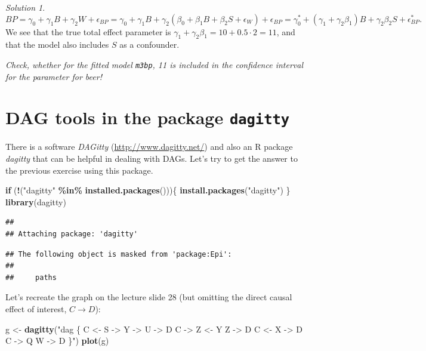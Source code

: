 \documentclass[
]{book}
\newenvironment{Shaded}{\begin{snugshade}}{\end{snugshade}}
\newcommand{\ControlFlowTok}[1]{\textcolor[rgb]{0.13,0.29,0.53}{\textbf{#1}}}
\newcommand{\FunctionTok}[1]{\textcolor[rgb]{0.13,0.29,0.53}{\textbf{#1}}}
\newcommand{\NormalTok}[1]{#1}
\newcommand{\OtherTok}[1]{\textcolor[rgb]{0.56,0.35,0.01}{#1}}
\newcommand{\SpecialCharTok}[1]{\textcolor[rgb]{0.81,0.36,0.00}{\textbf{#1}}}
\newcommand{\StringTok}[1]{\textcolor[rgb]{0.31,0.60,0.02}{#1}}
\theoremstyle{definition}
\theoremstyle{definition}
\theoremstyle{definition}
\theoremstyle{definition}
\theoremstyle{remark}
\newtheorem*{solution}{Solution}
\begin{document}
\begin{solution}
\[BP = \gamma_0 + \gamma_1 B + \gamma_2W + \epsilon_{BP} = 
\gamma_0 + \gamma_1 B + \gamma_2(\beta_0 + \beta_1 B + \beta_2S + \epsilon_W) + \epsilon_{BP} = \gamma_0^* + (\gamma_1 + \gamma_2\beta_1)B + \gamma_2\beta_2S + \epsilon_{BP}^*.\]
We see that the true total effect parameter is \(\gamma_1 + \gamma_2\beta_1 = 10 + 0.5\cdot 2 =11\), and that the model also includes \(S\) as a confounder.

\emph{Check, whether for the fitted model \texttt{m3bp}, 11 is included in the confidence interval for the parameter for beer!}

\end{solution}

\section{\texorpdfstring{DAG tools in the package \texttt{dagitty}}{DAG tools in the package dagitty}}\label{dag-tools-in-the-package-dagitty}

There is a software \emph{DAGitty} (\url{http://www.dagitty.net/}) and also an R package \emph{dagitty} that can be helpful in dealing with DAGs. Let's try to get the answer to the previous exercise using this package.

\begin{Shaded}
\begin{Highlighting}[]
\ControlFlowTok{if}\NormalTok{ (}\SpecialCharTok{!}\NormalTok{(}\StringTok{"dagitty"} \SpecialCharTok{\%in\%} \FunctionTok{installed.packages}\NormalTok{()))\{}
  \FunctionTok{install.packages}\NormalTok{(}\StringTok{"dagitty"}\NormalTok{)}
\NormalTok{\}}
\FunctionTok{library}\NormalTok{(dagitty)}
\end{Highlighting}
\end{Shaded}

\begin{verbatim}
## 
## Attaching package: 'dagitty'
\end{verbatim}

\begin{verbatim}
## The following object is masked from 'package:Epi':
## 
##     paths
\end{verbatim}

Let's recreate the graph on the lecture slide 28 (but omitting the direct causal effect of interest, \(C \rightarrow D\)):

\begin{Shaded}
\begin{Highlighting}[]
\NormalTok{g }\OtherTok{\textless{}{-}} \FunctionTok{dagitty}\NormalTok{(}\StringTok{"dag \{}
\StringTok{    C \textless{}{-} S {-}\textgreater{} Y {-}\textgreater{} U {-}\textgreater{} D}
\StringTok{    C {-}\textgreater{} Z \textless{}{-} Y}
\StringTok{    Z {-}\textgreater{} D}
\StringTok{    C \textless{}{-} X {-}\textgreater{} D}
\StringTok{    C {-}\textgreater{} Q}
\StringTok{    W {-}\textgreater{} D}
\StringTok{  \}"}\NormalTok{)}
\FunctionTok{plot}\NormalTok{(g)}
\end{Highlighting}
\end{Shaded}
\end{document}
